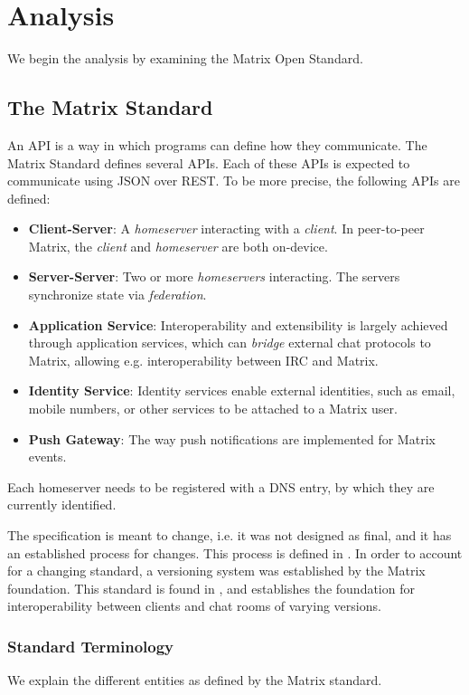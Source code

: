 \chapter{Analysis}
We begin the analysis by examining the Matrix Open Standard.

\section{The Matrix Standard}
An \ac{API} is a way in which programs can define how they communicate.
The Matrix Standard defines several \ac{API}s.
Each of these \ac{API}s is expected to communicate using \ac{JSON} over \ac{REST}.
To be more precise, the following \ac{API}s are defined\cite{matrix_org_spec}:
\begin{itemize}
    \item \textbf{Client-Server}: A \textit{homeserver} interacting with a \textit{client}. In peer-to-peer Matrix, the \textit{client} and \textit{homeserver} are both on-device.
    \item \textbf{Server-Server}: Two or more \textit{homeservers} interacting. The servers synchronize state via \textit{federation}.
    \item \textbf{Application Service}: Interoperability and extensibility is largely achieved through application services, which can \textit{bridge} external chat protocols to Matrix, allowing e.g. interoperability between \ac{IRC} and Matrix.
    \item \textbf{Identity Service}: Identity services enable external identities, such as email, mobile numbers, or other services to be attached to a Matrix user.
    \item \textbf{Push Gateway}: The way push notifications are implemented for Matrix events.
\end{itemize}

Each homeserver needs to be registered with a \ac{DNS} entry, by which they are currently identified.

The specification is meant to change, i.e. it was not designed as final, and it has an established process for changes.
This process is defined in \cite{matrix_org_spec_changes}.
In order to account for a changing standard, a versioning system was established by the Matrix foundation.
This standard is found in \cite{matrix_org_spec}, and establishes the foundation for interoperability between clients and chat rooms of varying versions.

\subsection{Standard Terminology}
We explain the different entities as defined by the Matrix standard.

